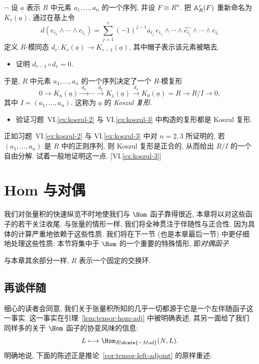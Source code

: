 \begin{prob}\label{ex:koszul-complex}
$\neg$ 设 $\underline{a}$ 表示 $R$ 中元素 $a_1,\dots,a_n$ 的一个序列, 并设 $F\cong R^n$. 把 $\mathbb{A}_R^r(F)$ 重新命名为 $K_r(\underline{a})$. 通过在基上令
\[
d(e_{i_1}\wedge\cdots\wedge e_{i_r})=\sum_{j=1}^r(-1)^{j-1}a_{i_j}\,e_{i_1}\wedge\cdots\wedge\widehat{e_{i_j}}\wedge\cdots\wedge e_{i_r}
\]
定义 $R$-模同态 $d_r:K_r(\underline{a})\to K_{r-1}(\underline{a})$, 其中帽子表示该元素被略去.
\begin{itemize}
\item 证明 $d_{r-1}\circ d_r=0$.
\end{itemize}
于是, $R$ 中元素 $a_1,\dots,a_n$ 的一个序列决定了一个 $R$-模复形
\[
0\longrightarrow K_n(\underline{a})\xrightarrow{\ d_n\ }\cdots\xrightarrow{\ d_2\ }K_1(\underline{a})\xrightarrow{\ d_1\ }K_0(\underline{a})=R\longrightarrow R/I\longrightarrow 0,
\]
其中 $I=(a_1,\dots,a_n)$. 这称为 $\underline{a}$ 的 \emph{Koszul 复形}.
\begin{itemize}
\item 验证习题~VI.\ref{ex:koszul-2} 与 VI.\ref{ex:koszul-3} 中构造的复形都是 Koszul 复形.
\end{itemize}
正如习题~VI.\ref{ex:koszul-2} 与 VI.\ref{ex:koszul-3} 中对 $n=2,3$ 所证明的, 若 $(a_1,\dots,a_n)$ 是 $R$ 中的正则序列, 则 Koszul 复形是正合的, 从而给出 $R/I$ 的一个自由分解. 试着一般地证明这一点. [VI.\ref{ex:koszul-3}]
\end{prob}

\section{Hom 与对偶}\label{sec:hom-duals}

我们对张量积的快速纵览不时地使我们与 $\Hom$ 函子靠得很近, 本章将以对这些函子的若干关注收尾. 与张量的情形一样, 我们将全神贯注于伴随性与正合性, 因为具体的计算严重地依赖于这些性质. 我们将在下一节 (也是本章最后一节) 中更仔细地处理这些性质; 本节将集中于 $\Hom$ 的一个重要的特殊情形, 即\emph{对偶函子}.

与本章其余部分一样, $R$ 表示一个固定的交换环.

\subsection{再谈伴随}\label{subsec:hom-adjunction-again}

细心的读者会同意, 我们关于张量积所知的几乎一切都源于它是一个左伴随函子这一事实. 这一事实在引理~\ref{lem:tensor-hom-adj} 中被明确表述, 其另一面给了我们同样多的关于 $\Hom$ 函子的协变风味的信息:
\[
L\longmapsto\Hom_{R\dcate{-Mod}}(N,L).
\]
明确地说, 下面的陈述正是推论~\ref{cor:tensor-left-adjoint} 的原样重述:

